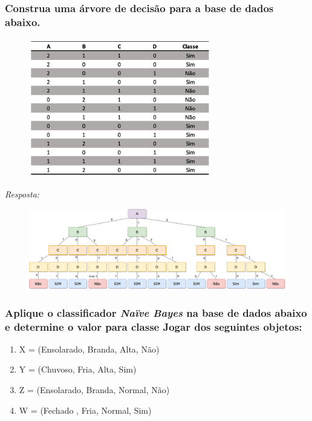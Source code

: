\documentclass{article}
\begin{document}
\subsubsection{Construa uma árvore de decisão para a base de dados abaixo.}
  \begin{figure}[H]
    \centering 
    \includegraphics[width=8cm]{tab-5-2-3.png} 
  \end{figure}

\textit{Resposta:} 

\begin{figure}[H]
  \centering 
  \includegraphics[width=17cm]{arvore-decisao.png} 
\end{figure}

\subsubsection{Aplique o classificador \textit{Naïve Bayes} na base de dados abaixo e determine o valor para classe \textbf{Jogar} dos seguintes objetos:}
\begin{enumerate}[label=\alph*]
    \item X = (Ensolarado, Branda, Alta, Não)
    \item Y = (Chuvoso, Fria, Alta, Sim)
    \item Z = (Ensolarado, Branda, Normal, Não)
    \item W = (Fechado , Fria, Normal, Sim)
\end{enumerate}
\end{document}
